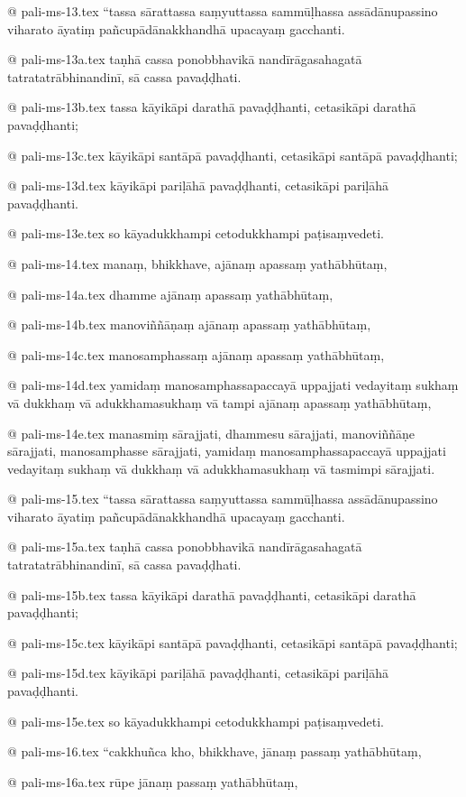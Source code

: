 @ pali-ms-13.tex
“tassa sārattassa saṃyuttassa sammūḷhassa assādānupassino viharato āyatiṃ pañcupādānakkhandhā upacayaṃ gacchanti.

@ pali-ms-13a.tex
taṇhā cassa ponobbhavikā nandīrāgasahagatā tatratatrābhinandinī, sā cassa pavaḍḍhati.

@ pali-ms-13b.tex
tassa kāyikāpi darathā pavaḍḍhanti, cetasikāpi darathā pavaḍḍhanti;

@ pali-ms-13c.tex
kāyikāpi santāpā pavaḍḍhanti, cetasikāpi santāpā pavaḍḍhanti;

@ pali-ms-13d.tex
kāyikāpi pariḷāhā pavaḍḍhanti, cetasikāpi pariḷāhā pavaḍḍhanti.

@ pali-ms-13e.tex
so kāyadukkhampi cetodukkhampi paṭisaṃvedeti.

@ pali-ms-14.tex
manaṃ, bhikkhave, ajānaṃ apassaṃ yathābhūtaṃ,

@ pali-ms-14a.tex
dhamme ajānaṃ apassaṃ yathābhūtaṃ,

@ pali-ms-14b.tex
manoviññāṇaṃ ajānaṃ apassaṃ yathābhūtaṃ,

@ pali-ms-14c.tex
manosamphassaṃ ajānaṃ apassaṃ yathābhūtaṃ,

@ pali-ms-14d.tex
yamidaṃ manosamphassapaccayā uppajjati vedayitaṃ sukhaṃ vā dukkhaṃ vā adukkhamasukhaṃ vā tampi ajānaṃ apassaṃ yathābhūtaṃ,

@ pali-ms-14e.tex
manasmiṃ sārajjati, dhammesu sārajjati, manoviññāṇe sārajjati, manosamphasse sārajjati, yamidaṃ manosamphassapaccayā uppajjati vedayitaṃ sukhaṃ vā dukkhaṃ vā adukkhamasukhaṃ vā tasmimpi sārajjati.

@ pali-ms-15.tex
“tassa sārattassa saṃyuttassa sammūḷhassa assādānupassino viharato āyatiṃ pañcupādānakkhandhā upacayaṃ gacchanti.

@ pali-ms-15a.tex
taṇhā cassa ponobbhavikā nandīrāgasahagatā tatratatrābhinandinī, sā cassa pavaḍḍhati.

@ pali-ms-15b.tex
tassa kāyikāpi darathā pavaḍḍhanti, cetasikāpi darathā pavaḍḍhanti;

@ pali-ms-15c.tex
kāyikāpi santāpā pavaḍḍhanti, cetasikāpi santāpā pavaḍḍhanti;

@ pali-ms-15d.tex
kāyikāpi pariḷāhā pavaḍḍhanti, cetasikāpi pariḷāhā pavaḍḍhanti.

@ pali-ms-15e.tex
so kāyadukkhampi cetodukkhampi paṭisaṃvedeti.

@ pali-ms-16.tex
“cakkhuñca kho, bhikkhave, jānaṃ passaṃ yathābhūtaṃ,

@ pali-ms-16a.tex
rūpe jānaṃ passaṃ yathābhūtaṃ,

